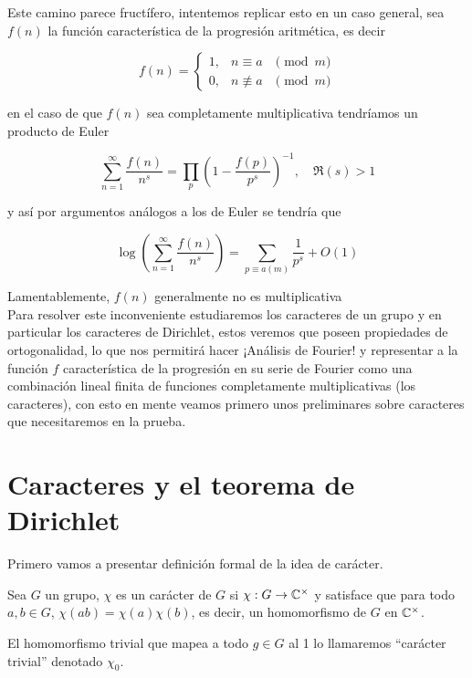 Este camino parece fructífero, intentemos replicar esto en un caso general, sea $f(n)$ la función característica de la progresión aritmética, es decir

$$
f(n)=\left\{\begin{array}{lll}
1, & n \equiv a & \pmod{m} \\
0, & n \not \equiv a & \pmod{m}
\end{array}\right.
$$

en el caso de que $f(n)$ sea completamente multiplicativa tendríamos un producto de Euler

$$
\sum_{n=1}^{\infty} \frac{f(n)}{n^s}=\prod_p\left(1-\frac{f(p)}{p^s}\right)^{-1}, \quad \Re(s)>1
$$

y así por argumentos análogos a los de Euler se tendría que

$$\log \left(\sum_{n=1}^{\infty} \frac{f(n)}{n^s}\right)=\sum_{p \equiv a(m)} \frac{1}{p^s}+O(1)$$

Lamentablemente, $f(n)$ generalmente no es multiplicativa\\

Para resolver este inconveniente estudiaremos los caracteres de un grupo y en particular los caracteres de Dirichlet, estos veremos que poseen propiedades de ortogonalidad, lo que nos permitirá hacer ¡Análisis de Fourier! y representar a la función $f$ característica de la progresión en su serie de Fourier como una combinación lineal finita de funciones completamente multiplicativas (los caracteres), con esto en mente veamos primero unos preliminares sobre caracteres que necesitaremos en la prueba.

\section{Caracteres y el teorema de Dirichlet}

Primero vamos a presentar definición formal de la idea de carácter.\\

\begin{definition}
Sea $G$ un grupo, $\chi$ es un carácter de $G$ si $\chi: G\to \mathbb{C}^{\times}$ y satisface que para todo $a,b\in G$, $\chi(ab)=\chi(a)\chi(b)$, es decir, un homomorfismo de $G$ en $\mathbb{C}^{\times}$.
\end{definition}

 El homomorfismo trivial que mapea a todo $g\in G$ al 1 lo llamaremos ``carácter trivial'' denotado $\chi_0$.\\

